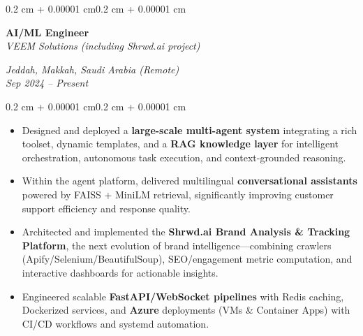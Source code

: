 \documentclass[10pt, letterpaper]{article}
\newenvironment{highlights}{
  \begin{itemize}[
    topsep=0.10 cm,
    parsep=0.10 cm,
    partopsep=0pt,
    itemsep=0pt,
    leftmargin=0.4 cm + 10pt
  ]}
  {\end{itemize}
}
\newenvironment{onecolentry}{
  \begin{adjustwidth}{0.2 cm + 0.00001 cm}{0.2 cm + 0.00001 cm}
}{
  \end{adjustwidth}
}
\newenvironment{twocolentry}[2][]{
  \onecolentry
  \def\secondColumn{#2}
  \setcolumnwidth{\fill, 4.5 cm}
  \begin{paracol}{2}
}{
  \switchcolumn \raggedleft \secondColumn
  \end{paracol}
  \endonecolentry
}
\begin{document}
\begin{twocolentry}{
  \textit{Jeddah, Makkah, Saudi Arabia (Remote)} \\
  \textit{Sep 2024 -- Present}}
  \textbf{AI/ML Engineer} \\
  \textit{VEEM Solutions (including Shrwd.ai project)}
\end{twocolentry}
\vspace{0.10 cm}
\begin{onecolentry}
  \begin{highlights}
    \item Designed and deployed a \textbf{large-scale multi-agent system} integrating a rich toolset, dynamic templates, and a \textbf{RAG knowledge layer} for intelligent orchestration, autonomous task execution, and context-grounded reasoning.
    \item Within the agent platform, delivered multilingual \textbf{conversational assistants} powered by FAISS + MiniLM retrieval, significantly improving customer support efficiency and response quality.
    \item Architected and implemented the \textbf{Shrwd.ai Brand Analysis \& Tracking Platform}, the next evolution of brand intelligence—combining crawlers (Apify/Selenium/BeautifulSoup), SEO/engagement metric computation, and interactive dashboards for actionable insights.
    \item Engineered scalable \textbf{FastAPI/WebSocket pipelines} with Redis caching, Dockerized services, and \textbf{Azure} deployments (VMs \& Container Apps) with CI/CD workflows and systemd automation.
  \end{highlights}
\end{onecolentry}
\end{document}
